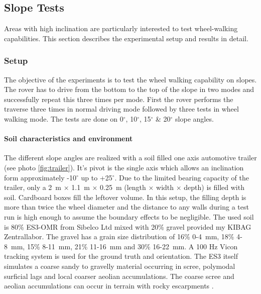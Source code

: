 \documentclass[a4paper,twocolumn]{esapub2005} %
\begin{document}

\subsection{Slope Tests}

Areas with high inclination are particularly interested to test wheel-walking
capabilities. This section describes the experimental setup and results in detail.

\subsubsection{Setup} The objective of the experiments is to test the wheel
walking capability on slopes. The rover has to drive from the bottom to the top
of the slope in two modes and successfully repeat this three times per mode.
First the rover performs the traverse three times in normal driving mode
followed by three tests in wheel walking mode. The tests are done on
0$^{\circ}$, 10$^{\circ}$, 15$^{\circ}$ \& 20$^{\circ}$ slope angles. 

\paragraph{Soil characteristics and environment} The different slope angles are
realized with a soil filled one axis automotive trailer (see photo
\ref{fig:trailer}). It's pivot is the single axis which allows an inclination
form approximately -10$^{\circ}$ up to +25$^{\circ}$. Due to the limited
bearing capacity of the trailer, only a 2~\unit{m} $\times$ 1.1~\unit{m}
$\times$ 0.25~\unit{m} (length $\times$ width $\times$ depth) is filled with
soil. Cardboard boxes fill the leftover volume. In this setup, the filling
depth is more than twice the wheel diameter and the distance to any walls
during a test run is high enough to assume  the boundary effects to be
negligible.  The used soil is 80\% ES3-OMR from Sibelco Ltd mixed with 20\%
gravel provided my KIBAG Zentrallabor. The gravel has a grain size distribution
of 16\% 0-4~\unit{mm}, 18\% 4-8~\unit{mm}, 15\% 8-11~\unit{mm}, 21\%
11-16~\unit{mm} and 30\% 16-22~\unit{mm}.  A 100 Hz Vicon tracking system is
used for the ground truth and orientation. The ES3 itself simulates a coarse
sandy to gravelly material occurring in scree, polymodal surficial lags and
local coarser aeolian accumulations. The coarse scree and aeolian accumulations
can occur in terrain with rocky escarpments \cite{michaud2014}.
\end{document}

